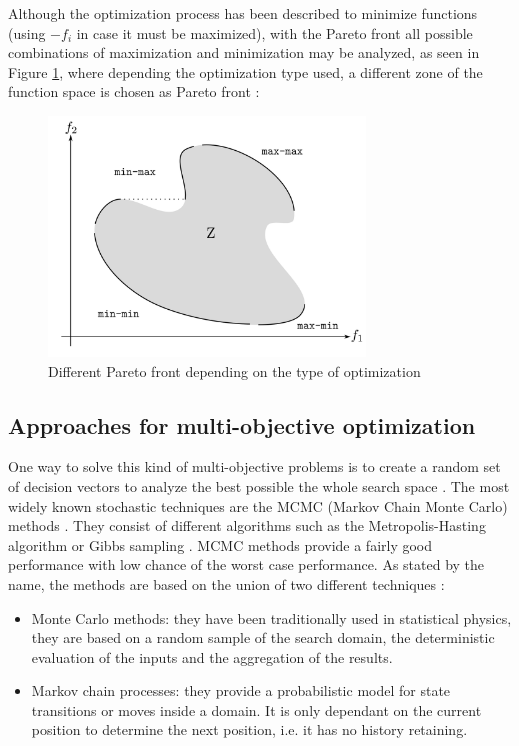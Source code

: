    Although the optimization process has been described to minimize functions (using $-f_i$ in  case it must be maximized), with the Pareto front all possible combinations of maximization and minimization may be analyzed, as seen in Figure \ref{fig:maxmaxminmin}, where depending the optimization type used, a different zone of the function space is chosen as Pareto front \cite{deb2001multi}:
    \begin{figure}[h!]
        \centering
        \includegraphics[width=0.75\textwidth]{Figures/2/maxmaxminmin.png}
        \caption{Different Pareto front depending on the type of optimization}
        \label{fig:maxmaxminmin}
    \end{figure}
    
\newpage

\subsection{Approaches for multi-objective optimization}
    One way to solve this kind of multi-objective problems is to create a random set of decision vectors to analyze the best possible the whole search space \cite{li2012momcmc}. The most widely known stochastic techniques are the MCMC (Markov Chain Monte Carlo) methods \cite{spall2005introduction}. They consist of different algorithms such as the Metropolis-Hasting algorithm \cite{altekar2004parallel} or Gibbs sampling \cite{gilks1992adaptive}. MCMC methods provide a fairly good performance with low chance of the worst case performance. As stated by the name, the methods are based on the union of two different techniques \cite{cleverAlgorithms}:
    \begin{itemize}
        \item Monte Carlo methods: they have been traditionally used in statistical physics, they are based on a random sample of the search domain, the deterministic evaluation of the inputs and the aggregation of the results.
        \item Markov chain processes: they provide a probabilistic model for state transitions or moves inside a domain. It is only dependant on the current position to determine the next position, i.e. it has no history retaining. 
    \end{itemize}
    
